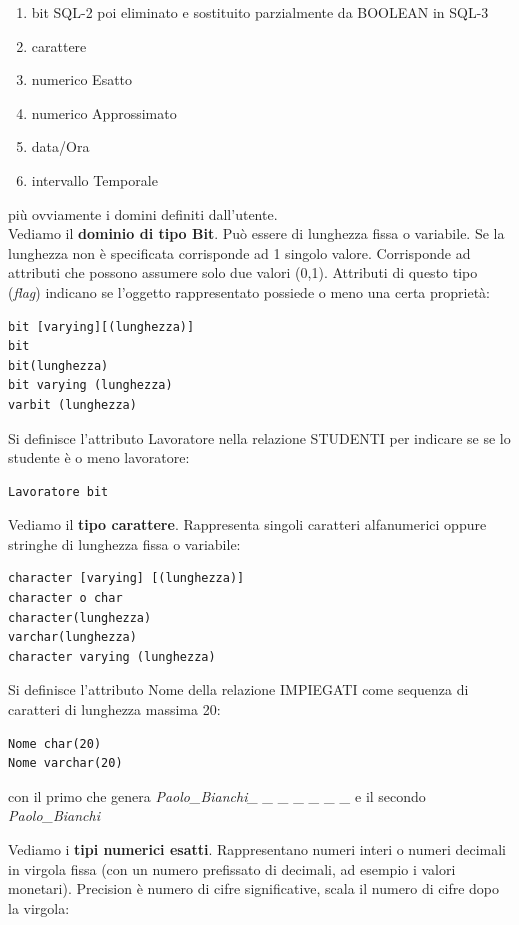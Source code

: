 \documentclass[a4paper,12pt, oneside]{book}
\begin{document}
\begin{enumerate}
\item bit SQL-2 poi eliminato e sostituito parzialmente da
BOOLEAN in SQL-3
\item carattere
\item numerico Esatto
\item numerico Approssimato
\item data/Ora
\item intervallo Temporale
\end{enumerate}
più ovviamente i domini definiti dall'utente.\\
Vediamo il \textbf{dominio di tipo Bit}. Può essere di lunghezza fissa o variabile. Se la lunghezza non
è specificata corrisponde ad 1 singolo valore.
Corrisponde ad attributi che possono assumere solo due valori
(0,1). Attributi di questo tipo (\textit{flag}) indicano se l'oggetto rappresentato possiede o meno una certa proprietà:
\begin{verbatim}
bit [varying][(lunghezza)]
bit
bit(lunghezza)
bit varying (lunghezza)
varbit (lunghezza)
\end{verbatim}
\begin{esempio}
Si definisce l'attributo Lavoratore nella relazione STUDENTI per indicare se se lo studente è o meno lavoratore:
\begin{verbatim}
Lavoratore bit
\end{verbatim}
\end{esempio}
Vediamo il \textbf{tipo carattere}. Rappresenta singoli caratteri alfanumerici oppure stringhe di lunghezza fissa o variabile:
\begin{verbatim}
character [varying] [(lunghezza)]
character o char
character(lunghezza)
varchar(lunghezza)
character varying (lunghezza)
\end{verbatim}
\begin{esempio}
Si definisce l'attributo Nome della relazione IMPIEGATI come sequenza di caratteri di lunghezza massima 20:
\begin{verbatim}
Nome char(20)
Nome varchar(20)
\end{verbatim}
con il primo che genera \textit{Paolo\_Bianchi\_ \_ \_ \_ \_ \_ \_} e il secondo \textit{Paolo\_Bianchi}
\end{esempio}
Vediamo i \textbf{tipi numerici esatti}. Rappresentano numeri interi o numeri decimali in virgola fissa (con un
numero prefissato di decimali, ad esempio i valori monetari). Precision è numero di cifre significative, scala il numero di cifre dopo la virgola:
\end{document}
